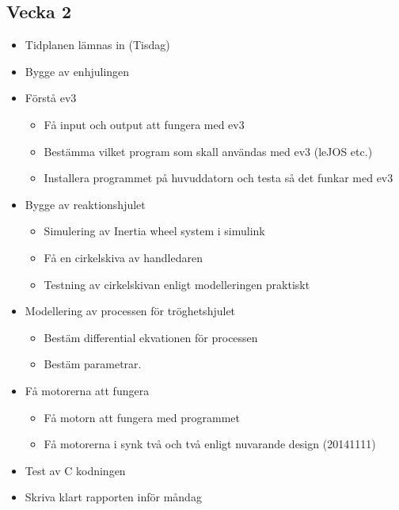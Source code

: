 \documentclass[a4paper]{article}
\begin{document}
	\subsection*{Vecka 2}
	\begin{itemize}
    		\item Tidplanen lämnas in (Tisdag)
    		\item Bygge av enhjulingen
		\item Förstå ev3
	\begin{itemize}
		\item Få input och output att fungera med ev3
		\item Bestämma vilket program som skall användas med ev3 (leJOS etc.)
		\item Installera programmet på huvuddatorn och testa så det funkar med ev3
	\end{itemize}

		
    		\item Bygge av reaktionshjulet
    	
    	\begin{itemize}
    \item Simulering av Inertia wheel system i simulink
    		\item Få en cirkelskiva av handledaren
		\item Testning av cirkelskivan enligt modelleringen praktiskt
    	\end{itemize}
    \item Modellering av processen för tröghetshjulet
    		\begin{itemize}
			\item Bestäm differential ekvationen för processen
    			\item Bestäm parametrar.
		\end{itemize}        
	
	\item Få motorerna att fungera
	\begin{itemize}
		\item Få motorn att fungera med programmet
		\item Få motorerna i synk två och två enligt nuvarande design (20141111)
	\end{itemize}
	\item Test av C kodningen
	
	\item Skriva klart rapporten inför måndag
	
	\end{itemize}
	
\end{document}
